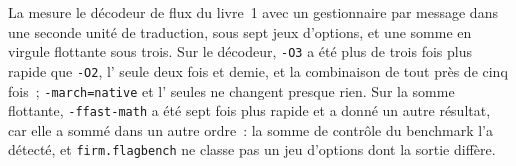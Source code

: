 La  mesure le décodeur de flux du livre~1 avec un gestionnaire par message
dans une seconde unité de traduction, sous sept jeux d'options, et une somme en virgule flottante sous trois. Sur le décodeur,
\texttt{-O3} a été plus de trois fois plus rapide que \texttt{-O2}, l' seule deux fois et demie,
et la combinaison de tout près de cinq fois~; \texttt{-march=native} et l' seules ne changent presque
rien. Sur la somme flottante, \texttt{-ffast-math} a été sept fois plus rapide et a donné un autre résultat, car elle a sommé dans
un autre ordre~: la somme de contrôle du benchmark l'a détecté, et \texttt{firm.flagbench} ne classe pas un jeu d'options dont la sortie
diffère.

